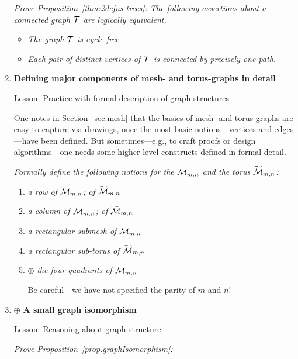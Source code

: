 \begin{enumerate}
{\em Prove Proposition~\ref{thm:2defns-trees}:
The following assertions about a connected graph $\mbox{$\cal T$}$ are  logically equivalent.}
  \begin{itemize}
  \item
{\em The graph $\mbox{$\cal T$}$ is cycle-free.}
  \medskip\item
{\em Each pair of distinct vertices of $\mbox{$\cal T$}$ is connected by precisely one path.}
  \end{itemize}

\medskip\item
{\bf Defining major components of mesh- and torus-graphs in detail}

{\sc Lesson:} Practice with formal description of graph structures

\smallskip

One notes in Section~\ref{sec:mesh} that the basics of mesh- and torus-graphs are easy to capture via drawings, once the most basic notions---vertices and edges---have been defined.  But sometimes---e.g., to craft proofs or design algorithms---one needs some higher-level constructs defined in formal detail.

\smallskip

{\em Formally define the following notions for the $\mbox{$\cal M$}_{m,n}$ and the torus $\widetilde{\mbox{$\cal M$}}_{m,n}$:}
  \begin{enumerate}
  \item
{\em a {\em row} of $\mbox{$\cal M$}_{m,n}$; of $\widetilde{\mbox{$\cal M$}}_{m,n}$}
  \medskip\item
{\em a {\em column} of $\mbox{$\cal M$}_{m,n}$; of $\widetilde{\mbox{$\cal M$}}_{m,n}$}
  \medskip\item
{\em a {\em rectangular submesh} of $\mbox{$\cal M$}_{m,n}$}
  \medskip\item
{\em a {\em rectangular sub-torus} of $\widetilde{\mbox{$\cal M$}}_{m,n}$}
  \medskip\item
$\oplus$
{\em the {\em four quadrants} of $\mbox{$\cal M$}_{m,n}$}

\smallskip

Be careful---we have not specified the parity of $m$ and $n$!
  \end{enumerate}

\medskip\item
$\oplus$
{\bf A small graph isomorphism}

{\sc Lesson:} Reasoning about graph structure

\smallskip

{\em Prove Proposition~\ref{prop.graphIsomorphism}:}

\smallskip


\end{enumerate}
